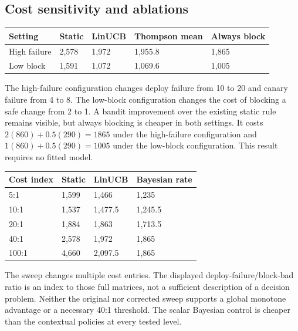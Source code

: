 \documentclass[
  10pt,
]{article}
\begin{document}
\subsection{Cost sensitivity and
ablations}\label{cost-sensitivity-and-ablations}

\par\medskip\noindent\begin{minipage}{\linewidth}\centering
\begin{tabular}{@{}lllll@{}}
\toprule\noalign{}
Setting & Static & LinUCB & Thompson mean & Always block \\
\midrule\noalign{}
High failure & 2,578 & 1,972 & 1,955.8 & 1,865 \\
Low block & 1,591 & 1,072 & 1,069.6 & 1,005 \\
\bottomrule
\end{tabular}
\end{minipage}\par\medskip

The high-failure configuration changes deploy failure from 10 to 20 and
canary failure from 4 to 8. The low-block configuration changes the cost
of blocking a safe change from 2 to 1. A bandit improvement over the
existing static rule remains visible, but always blocking is cheaper in
both settings. It costs \(2(860)+0.5(290)=1865\) under the high-failure
configuration and \(1(860)+0.5(290)=1005\) under the low-block
configuration. This result requires no fitted model.

\par\medskip\noindent\begin{minipage}{\linewidth}\centering
\begin{tabular}{@{}llll@{}}
\toprule\noalign{}
Cost index & Static & LinUCB & Bayesian rate \\
\midrule\noalign{}
5:1 & 1,599 & 1,466 & 1,235 \\
10:1 & 1,537 & 1,477.5 & 1,245.5 \\
20:1 & 1,884 & 1,863 & 1,713.5 \\
40:1 & 2,578 & 1,972 & 1,865 \\
100:1 & 4,660 & 2,097.5 & 1,865 \\
\bottomrule
\end{tabular}
\end{minipage}\par\medskip

The sweep changes multiple cost entries. The displayed
deploy-failure/block-bad ratio is an index to those full matrices, not a
sufficient description of a decision problem. Neither the original nor
corrected sweep supports a global monotone advantage or a necessary 40:1
threshold. The scalar Bayesian control is cheaper than the contextual
policies at every tested level.
\end{document}
